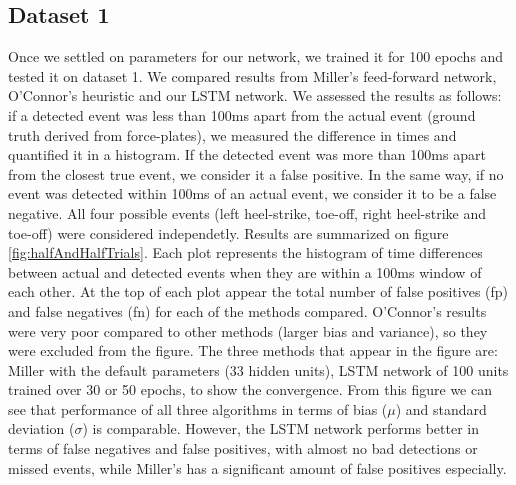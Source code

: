 \documentclass{acm_proc_article-sp}
\begin{document}
\subsection{Dataset 1}
Once we settled on parameters for our network, we trained it for 100 epochs and tested it on dataset 1. We compared results from Miller's feed-forward network, O'Connor's heuristic and our LSTM network. We assessed the results as follows: if a detected event was less than 100ms apart from the actual event (ground truth derived from force-plates), we measured the difference in times and quantified it in a histogram. If the detected event was more than 100ms apart from the closest true event, we consider it a false positive. In the same way, if no event was detected within 100ms of an actual event, we consider it to be a false negative. All four possible events (left heel-strike, toe-off, right heel-strike and toe-off) were considered independetly.  Results are summarized on figure \ref{fig:halfAndHalfTrials}. Each plot represents the histogram of time differences between actual and detected events when they are within a 100ms window of each other. At the top of each plot appear the total number of false positives (fp) and false negatives (fn) for each of the methods compared. O'Connor's results were very poor compared to other methods (larger bias and variance), so they were excluded from the figure. The three methods that appear in the figure are: Miller with the default parameters (33 hidden units), LSTM network of 100 units trained over 30 or 50 epochs, to show the convergence. From this figure we can see that performance of all three algorithms in terms of bias ($\mu$) and standard deviation ($\sigma$) is comparable. However, the LSTM network performs better in terms of false negatives and false positives, with almost no bad detections or missed events, while Miller's has a significant amount of false positives especially.\\
\end{document}
